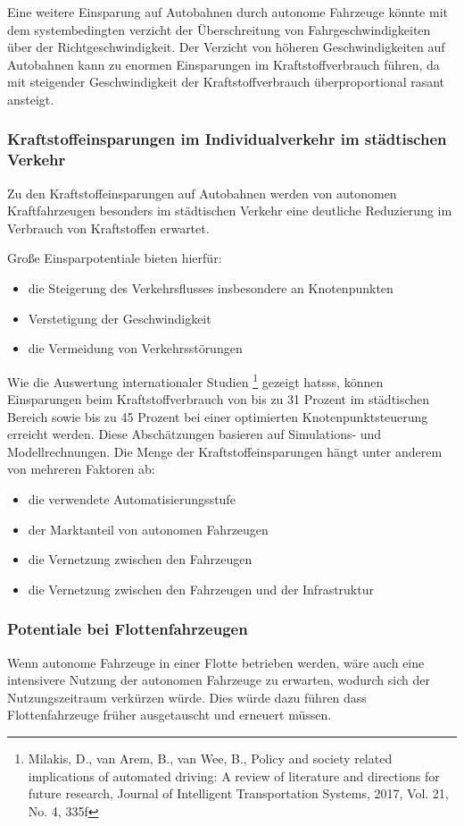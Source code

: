 Eine weitere Einsparung auf Autobahnen durch autonome Fahrzeuge könnte mit
dem systembedingten verzicht der Überschreitung von Fahrgeschwindigkeiten über der Richtgeschwindigkeit.
Der Verzicht von höheren Geschwindigkeiten auf Autobahnen kann zu enormen Einsparungen im Kraftstoffverbrauch führen,
da mit steigender Geschwindigkeit der Kraftstoffverbrauch überproportional rasant ansteigt.

\subsubsection{Kraftstoffeinsparungen im Individualverkehr im städtischen Verkehr}
Zu den Kraftstoffeinsparungen auf Autobahnen werden von
autonomen Kraftfahrzeugen besonders im städtischen Verkehr
eine deutliche Reduzierung im Verbrauch von Kraftstoffen erwartet.

Große Einsparpotentiale bieten hierfür:
\begin{itemize}
	\item die Steigerung des Verkehrsflusses insbesondere an Knotenpunkten
	\item Verstetigung der Geschwindigkeit
	\item die Vermeidung von Verkehrsstörungen
\end{itemize}

Wie die Auswertung internationaler Studien
\footnote{Milakis, D., van Arem, B., van Wee, B., Policy and society related implications of
	automated driving: A review of literature and directions for future research, Journal of
	Intelligent Transportation Systems, 2017, Vol. 21, No. 4, 335f} gezeigt hatsss,
können Einsparungen beim Kraftstoffverbrauch von
bis zu 31 Prozent im städtischen Bereich sowie
bis zu 45 Prozent bei einer optimierten Knotenpunktsteuerung erreicht werden.
Diese Abschätzungen basieren auf Simulations- und Modellrechnungen.
Die Menge der  Kraftstoffeinsparungen hängt unter anderem von mehreren Faktoren ab:
\begin{itemize}
	\item die verwendete Automatisierungsstufe
	\item der Marktanteil von autonomen Fahrzeugen
	\item die Vernetzung zwischen den Fahrzeugen
	\item die Vernetzung zwischen den Fahrzeugen und der Infrastruktur
\end{itemize}

\subsubsection{Potentiale bei Flottenfahrzeugen}
Wenn autonome Fahrzeuge in einer Flotte betrieben werden, wäre auch eine intensivere Nutzung der autonomen Fahrzeuge zu erwarten,
wodurch sich der Nutzungszeitraum verkürzen würde.
Dies würde dazu führen dass Flottenfahrzeuge früher ausgetauscht und erneuert müssen.

